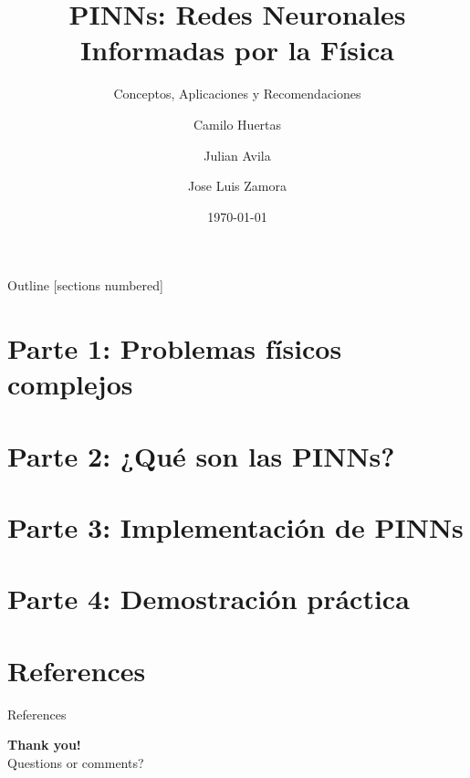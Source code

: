 \documentclass[aspectratio=169,sn-mathphys-num]{beamer}
\title{PINNs: Redes Neuronales Informadas por la Física}
\subtitle{Conceptos, Aplicaciones y Recomendaciones}
\author{Camilo Huertas \and Julian Avila \and Jose Luis Zamora}
\institute{Universidad Distrital Francisco José de Caldas}
\date{\today}
\begin{document}
\begin{frame}
  \titlepage
\end{frame}

\begin{frame}{Outline}
  [sections numbered]
  \tableofcontents
\end{frame}

\section{Parte 1: Problemas físicos complejos}


\section{Parte 2: ¿Qué son las PINNs?}


\section{Parte 3: Implementación de PINNs}


\section{Parte 4: Demostración práctica}


\section{References}
\begin{frame}[allowframebreaks]{References}
  \printbibliography
  \nocite{*}
\end{frame}

\begin{frame}[plain]
  \centering
  \vspace{1cm}
  {\Huge \textbf{Thank you!}}\\[1cm]
  {\large Questions or comments?}
\end{frame}
\end{document}
